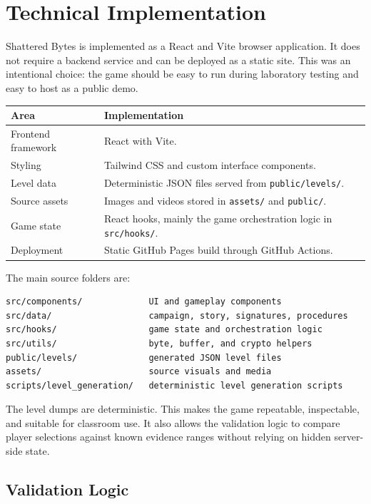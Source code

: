 \documentclass[11pt,a4paper]{article}
\newcommand{\projecttitle}{Shattered Bytes}
\begin{document}
\section{Technical Implementation}

\projecttitle{} is implemented as a React and Vite browser application. It does not require a backend service and can be deployed as a static site. This was an intentional choice: the game should be easy to run during laboratory testing and easy to host as a public demo.

\begin{longtable}{p{}p{}}
\toprule
\textbf{Area} & \textbf{Implementation} \\
\midrule
Frontend framework & React with Vite. \\
Styling & Tailwind CSS and custom interface components. \\
Level data & Deterministic JSON files served from \texttt{public/levels/}. \\
Source assets & Images and videos stored in \texttt{assets/} and \texttt{public/}. \\
Game state & React hooks, mainly the game orchestration logic in \texttt{src/hooks/}. \\
Deployment & Static GitHub Pages build through GitHub Actions. \\
\bottomrule
\end{longtable}

The main source folders are:

\begin{verbatim}
src/components/             UI and gameplay components
src/data/                   campaign, story, signatures, procedures
src/hooks/                  game state and orchestration logic
src/utils/                  byte, buffer, and crypto helpers
public/levels/              generated JSON level files
assets/                     source visuals and media
scripts/level_generation/   deterministic level generation scripts
\end{verbatim}

The level dumps are deterministic. This makes the game repeatable, inspectable, and suitable for classroom use. It also allows the validation logic to compare player selections against known evidence ranges without relying on hidden server-side state.

\subsection{Validation Logic}
\end{document}
